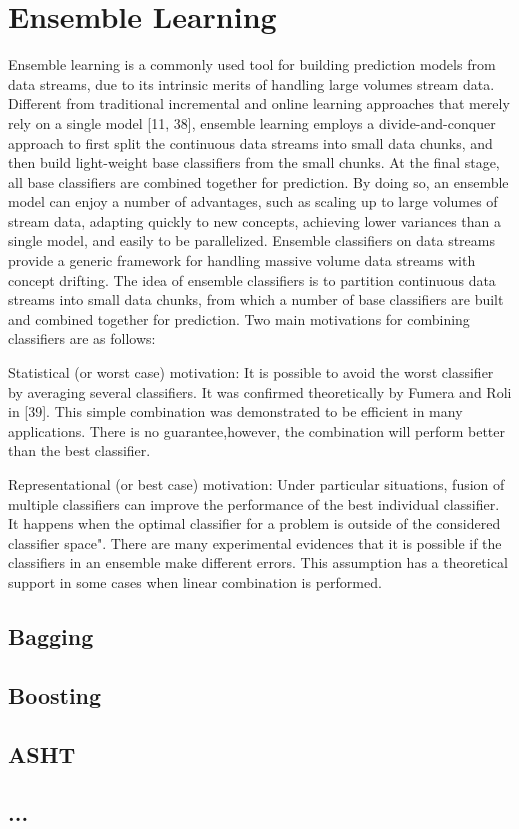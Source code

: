 \documentclass[a4paper, 11pt, oneside]{book}
\begin{document}
\section{Ensemble Learning}
Ensemble learning is a commonly used tool for building prediction models from data streams, due to
its intrinsic merits of handling large volumes stream data. Different from traditional incremental and
online learning approaches that merely rely on a single model [11, 38], ensemble learning employs a
divide-and-conquer approach to first split the continuous data streams into small data chunks, and
then build light-weight base classifiers from the small chunks. At the final stage, all base classifiers are
combined together for prediction. By doing so, an ensemble model can enjoy a number of advantages,
such as scaling up to large volumes of stream data, adapting quickly to new concepts, achieving lower
variances than a single model, and easily to be parallelized.
Ensemble classifiers on data streams provide a generic framework for handling massive volume data
streams with concept drifting. The idea of ensemble classifiers is to partition continuous data streams
into small data chunks, from which a number of base classifiers are built and combined together for
prediction. Two main motivations for combining classifiers are as follows:

Statistical (or worst case) motivation: It is possible to avoid the worst classifier by averaging
several classifiers. It was confirmed theoretically by Fumera and Roli in [39]. This simple
combination was demonstrated to be efficient in many applications. There is no guarantee,however, the combination will perform better than the best classifier.

Representational (or best case) motivation: Under particular situations, fusion of multiple
classifiers can improve the performance of the best individual classifier. It happens when the
optimal classifier for a problem is outside of the considered classifier space". There are many
experimental evidences that it is possible if the classifiers in an ensemble make different errors.
This assumption has a theoretical support in some cases when linear combination is performed.



\subsection{Bagging}
\subsection{Boosting}
\subsection{ASHT}
\subsection{...}



\end{document}
